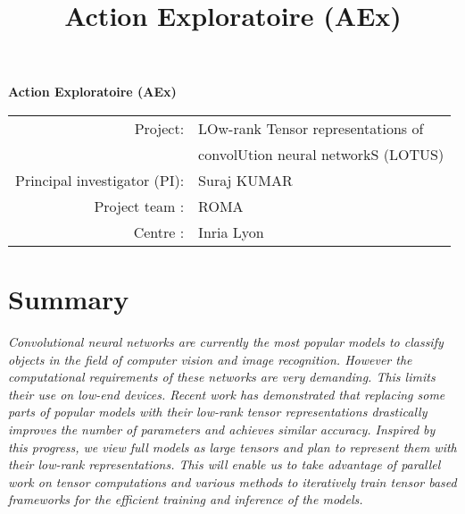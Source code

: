 \documentclass[11pt]{article}
\title{Action Exploratoire (AEx)}
\author{}
\date{}
\newcommand{\prname}{LOTUS\xspace}
\begin{document}

   \begin{center}
		\Large\textbf{Action Exploratoire (AEx)}
	\end{center}

	\begin{tabular}{rl}
		Project: & {\sc LOw-rank Tensor representations of}\\
		& {\sc convolUtion neural networkS (LOTUS)}\\
		Principal investigator (PI): & Suraj KUMAR\\
		Project team :&  ROMA\\
		Centre :& Inria Lyon
	\end{tabular}


\section*{Summary}
	\emph{Convolutional neural networks are currently the most popular models to classify objects in the field of computer vision and image recognition. However the computational requirements of these networks are very demanding. This limits their use on low-end devices. Recent work has demonstrated that replacing some parts of popular models with their low-rank tensor representations drastically improves the number of parameters and achieves similar accuracy. Inspired by this progress, we view full models as large tensors and plan to represent them with their low-rank representations. This will enable us to take advantage of parallel work on tensor computations and various methods to iteratively train tensor based frameworks for the efficient training and inference of the models.}
\end{document}
